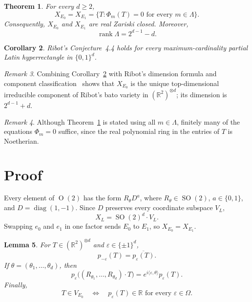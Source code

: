 \documentclass[11pt]{amsart}
\newtheorem{theorem}{Theorem}
\newtheorem{lemma}[theorem]{Lemma}
\newtheorem{corollary}[theorem]{Corollary}
\theoremstyle{remark}
\newtheorem{remark}[theorem]{Remark}
\newcommand{\R}{\mathbb{R}}
\newcommand{\OO}{\operatorname{O}}
\newcommand{\SO}{\operatorname{SO}}
\begin{document}
\begin{theorem}\label{thm:main}
For every $d\ge2$,
\[
X_{E_0}=X_{E_1}
=\{T:\Phi_m(T)=0\text{ for every }m\in\Lambda\}.
\]
Consequently, $X_{E_0}$ and $X_{E_1}$ are real Zariski closed. Moreover,
\[
\operatorname{rank}\Lambda=2^{d-1}-d.
\]
\end{theorem}

\begin{corollary}\label{cor:maximum}
Ribot's Conjecture~4.4 holds for every maximum-cardinality partial Latin
hyperrectangle in $\{0,1\}^d$.
\end{corollary}

\begin{remark}
Combining Corollary~\ref{cor:maximum} with Ribot's dimension formula and
component classification~\cite[Lemma~4.5 and Theorem~1.7]{Ribot} shows that
$X_{E_0}$ is the unique top-dimensional irreducible component of Ribot's
bato variety in $(\R^2)^{\otimes d}$; its dimension is $2^{d-1}+d$.
\end{remark}

\begin{remark}
Although Theorem~\ref{thm:main} is stated using all $m\in\Lambda$, finitely
many of the equations $\Phi_m=0$ suffice, since the real polynomial ring in
the entries of $T$ is Noetherian.
\end{remark}

\section{Proof}

Every element of $\OO(2)$ has the form $R_\theta D^a$, where
$R_\theta\in\SO(2)$, $a\in\{0,1\}$, and $D=\operatorname{diag}(1,-1)$.
Since $D$ preserves every coordinate subspace $V_L$,
\begin{equation}\label{eq:SO-reduction}
X_L=\SO(2)^d\cdot V_L.
\end{equation}
Swapping $e_0$ and $e_1$ in one factor sends $E_0$ to $E_1$, so
$X_{E_0}=X_{E_1}$.

\begin{lemma}\label{lem:fourier}
For $T\in(\R^2)^{\otimes d}$ and $\varepsilon\in\{\pm1\}^d$,
\[
p_{-\varepsilon}(T)=\overline{p_\varepsilon(T)}.
\]
If $\theta=(\theta_1,\ldots,\theta_d)$, then
\[
p_\varepsilon\bigl((R_{\theta_1},\ldots,R_{\theta_d})\cdot T\bigr)
=e^{i\langle\varepsilon,\theta\rangle}p_\varepsilon(T).
\]
Finally,
\[
T\in V_{E_0}
\quad\Longleftrightarrow\quad
p_\varepsilon(T)\in\R
\text{ for every }\varepsilon\in\Omega.
\]
\end{lemma}
\end{document}
